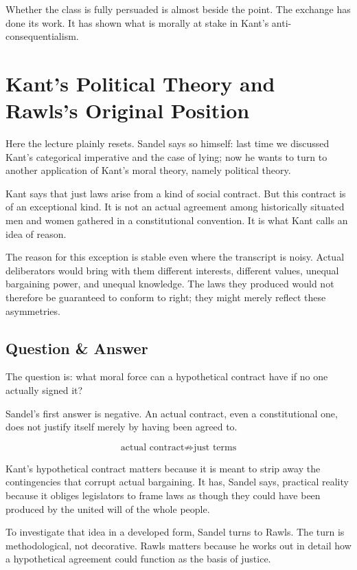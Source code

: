 Whether the class is fully persuaded is almost beside the point. The exchange has done its work. It has shown what is morally at stake in Kant's anti-consequentialism.

\section{Kant's Political Theory and Rawls's Original Position}

Here the lecture plainly resets. Sandel says so himself: last time we discussed Kant's categorical imperative and the case of lying; now he wants to turn to another application of Kant's moral theory, namely political theory.

Kant says that just laws arise from a kind of social contract. But this contract is of an exceptional kind. It is not an actual agreement among historically situated men and women gathered in a constitutional convention. It is what Kant calls an idea of reason.

The reason for this exception is stable even where the transcript is noisy. Actual deliberators would bring with them different interests, different values, unequal bargaining power, and unequal knowledge. The laws they produced would not therefore be guaranteed to conform to right; they might merely reflect these asymmetries.

\subsection{Question \& Answer}

The question is: what moral force can a hypothetical contract have if no one actually signed it?

Sandel's first answer is negative. An actual contract, even a constitutional one, does not justify itself merely by having been agreed to.

\begin{equation}
\text{actual contract} \not\Longrightarrow \text{just terms}
\end{equation}

Kant's hypothetical contract matters because it is meant to strip away the contingencies that corrupt actual bargaining. It has, Sandel says, practical reality because it obliges legislators to frame laws as though they could have been produced by the united will of the whole people.

To investigate that idea in a developed form, Sandel turns to Rawls. The turn is methodological, not decorative. Rawls matters because he works out in detail how a hypothetical agreement could function as the basis of justice.

